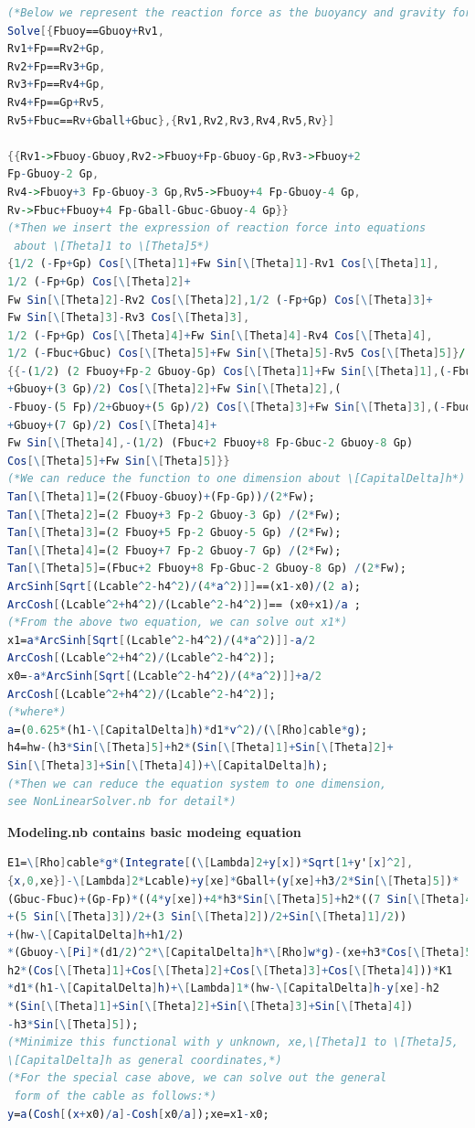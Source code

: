\documentclass[a4paper,12pt]{ctexart}
\begin{document}
\begin{footnotesize}
\begin{lstlisting}[language=Mathematica]
(*Below we represent the reaction force as the buoyancy and gravity force*)
Solve[{Fbuoy==Gbuoy+Rv1,
Rv1+Fp==Rv2+Gp,
Rv2+Fp==Rv3+Gp,
Rv3+Fp==Rv4+Gp,
Rv4+Fp==Gp+Rv5,
Rv5+Fbuc==Rv+Gball+Gbuc},{Rv1,Rv2,Rv3,Rv4,Rv5,Rv}]

{{Rv1->Fbuoy-Gbuoy,Rv2->Fbuoy+Fp-Gbuoy-Gp,Rv3->Fbuoy+2 
Fp-Gbuoy-2 Gp,
Rv4->Fbuoy+3 Fp-Gbuoy-3 Gp,Rv5->Fbuoy+4 Fp-Gbuoy-4 Gp,
Rv->Fbuc+Fbuoy+4 Fp-Gball-Gbuc-Gbuoy-4 Gp}}
(*Then we insert the expression of reaction force into equations
 about \[Theta]1 to \[Theta]5*)
{1/2 (-Fp+Gp) Cos[\[Theta]1]+Fw Sin[\[Theta]1]-Rv1 Cos[\[Theta]1],
1/2 (-Fp+Gp) Cos[\[Theta]2]+
Fw Sin[\[Theta]2]-Rv2 Cos[\[Theta]2],1/2 (-Fp+Gp) Cos[\[Theta]3]+
Fw Sin[\[Theta]3]-Rv3 Cos[\[Theta]3],
1/2 (-Fp+Gp) Cos[\[Theta]4]+Fw Sin[\[Theta]4]-Rv4 Cos[\[Theta]4],
1/2 (-Fbuc+Gbuc) Cos[\[Theta]5]+Fw Sin[\[Theta]5]-Rv5 Cos[\[Theta]5]}/.\%//Simplify
{{-(1/2) (2 Fbuoy+Fp-2 Gbuoy-Gp) Cos[\[Theta]1]+Fw Sin[\[Theta]1],(-Fbuoy-(3 Fp)/2
+Gbuoy+(3 Gp)/2) Cos[\[Theta]2]+Fw Sin[\[Theta]2],(
-Fbuoy-(5 Fp)/2+Gbuoy+(5 Gp)/2) Cos[\[Theta]3]+Fw Sin[\[Theta]3],(-Fbuoy-(7 Fp)/2
+Gbuoy+(7 Gp)/2) Cos[\[Theta]4]+
Fw Sin[\[Theta]4],-(1/2) (Fbuc+2 Fbuoy+8 Fp-Gbuc-2 Gbuoy-8 Gp)
Cos[\[Theta]5]+Fw Sin[\[Theta]5]}}
(*We can reduce the function to one dimension about \[CapitalDelta]h*)
Tan[\[Theta]1]=(2(Fbuoy-Gbuoy)+(Fp-Gp))/(2*Fw);
Tan[\[Theta]2]=(2 Fbuoy+3 Fp-2 Gbuoy-3 Gp) /(2*Fw);
Tan[\[Theta]3]=(2 Fbuoy+5 Fp-2 Gbuoy-5 Gp) /(2*Fw);
Tan[\[Theta]4]=(2 Fbuoy+7 Fp-2 Gbuoy-7 Gp) /(2*Fw);
Tan[\[Theta]5]=(Fbuc+2 Fbuoy+8 Fp-Gbuc-2 Gbuoy-8 Gp) /(2*Fw);
ArcSinh[Sqrt[(Lcable^2-h4^2)/(4*a^2)]]==(x1-x0)/(2 a);
ArcCosh[(Lcable^2+h4^2)/(Lcable^2-h4^2)]== (x0+x1)/a ;
(*From the above two equation, we can solve out x1*)
x1=a*ArcSinh[Sqrt[(Lcable^2-h4^2)/(4*a^2)]]-a/2 
ArcCosh[(Lcable^2+h4^2)/(Lcable^2-h4^2)];
x0=-a*ArcSinh[Sqrt[(Lcable^2-h4^2)/(4*a^2)]]+a/2 
ArcCosh[(Lcable^2+h4^2)/(Lcable^2-h4^2)];
(*where*)
a=(0.625*(h1-\[CapitalDelta]h)*d1*v^2)/(\[Rho]cable*g);
h4=hw-(h3*Sin[\[Theta]5]+h2*(Sin[\[Theta]1]+Sin[\[Theta]2]+
Sin[\[Theta]3]+Sin[\[Theta]4])+\[CapitalDelta]h);
(*Then we can reduce the equation system to one dimension,
see NonLinearSolver.nb for detail*)
\end{lstlisting}
\textbf{Modeling.nb contains basic modeing equation}
\begin{lstlisting}[language=Mathematica]
E1=\[Rho]cable*g*(Integrate[(\[Lambda]2+y[x])*Sqrt[1+y'[x]^2],
{x,0,xe}]-\[Lambda]2*Lcable)+y[xe]*Gball+(y[xe]+h3/2*Sin[\[Theta]5])*
(Gbuc-Fbuc)+(Gp-Fp)*((4*y[xe])+4*h3*Sin[\[Theta]5]+h2*((7 Sin[\[Theta]4])/2
+(5 Sin[\[Theta]3])/2+(3 Sin[\[Theta]2])/2+Sin[\[Theta]1]/2))
+(hw-\[CapitalDelta]h+h1/2)
*(Gbuoy-\[Pi]*(d1/2)^2*\[CapitalDelta]h*\[Rho]w*g)-(xe+h3*Cos[\[Theta]5]+
h2*(Cos[\[Theta]1]+Cos[\[Theta]2]+Cos[\[Theta]3]+Cos[\[Theta]4]))*K1
*d1*(h1-\[CapitalDelta]h)+\[Lambda]1*(hw-\[CapitalDelta]h-y[xe]-h2
*(Sin[\[Theta]1]+Sin[\[Theta]2]+Sin[\[Theta]3]+Sin[\[Theta]4])
-h3*Sin[\[Theta]5]);
(*Minimize this functional with y unknown, xe,\[Theta]1 to \[Theta]5,
\[CapitalDelta]h as general coordinates,*)
(*For the special case above, we can solve out the general
 form of the cable as follows:*)
y=a(Cosh[(x+x0)/a]-Cosh[x0/a]);xe=x1-x0;


\end{lstlisting}
\end{footnotesize}
\end{document}
